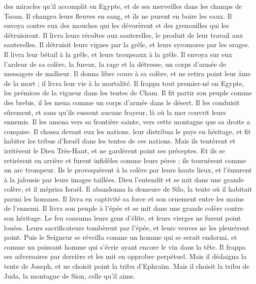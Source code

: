 \begin{multicols}{2}
des miracles qu’il accomplit en Egypte, et de ses merveilles dans les champs de Tsoan.
Il changea leurs fleuves en sang, et ils ne purent en boire les eaux.
Il envoya contre eux des mouches qui les dévorèrent et des grenouilles qui les détruisirent.
Il livra leurs récoltes aux sauterelles, le produit de leur travail aux sauterelles.
Il détruisit leurs vignes par la grêle, et leurs sycomores par les orages.
Il livra leur bétail à la grêle, et leurs troupeaux à la grêle.
Il envoya sur eux l'ardeur de sa colère, la fureur, la rage et la détresse, un corps d’armée de messagers de malheur.
Il donna libre cours à sa colère, et ne retira point leur âme de la mort ; il livra leur vie à la mortalité.
Il frappa tout premier-né en Egypte, les prémices de la vigueur dans les tentes de Cham.
Il fit partir son peuple comme des brebis, il les mena comme un corps d’armée dans le désert.
Il les conduisit sûrement, et sans qu’ils eussent aucune frayeur, là où la mer couvrit leurs ennemis.
Il les amena vers sa frontière sainte, vers cette montagne que sa droite a conquise.
Il chassa devant eux les nations, leur distribua le pays en héritage, et fit habiter les tribus d'Israël dans les tentes de ces nations.
Mais ils tentèrent et irritèrent le Dieu Très-Haut, et ne gardèrent point ses préceptes.
Et ils se retirèrent en arrière et furent infidèles comme leurs pères ; ils tournèrent comme un arc trompeur.
Ils le provoquèrent à la colère par leurs hauts lieux, et l’émurent à la jalousie par leurs images taillées.
Dieu l'entendit et se mit dans une grande colère, et il méprisa Israël.
Il abandonna la demeure de Silo, la tente où il habitait parmi les hommes.
Il livra en captivité sa force et son ornement entre les mains de l'ennemi.
Il livra son peuple à l'épée et se mit dans une grande colère contre son héritage.
Le feu consuma leurs gens d'élite, et leurs vierges ne furent point louées.
Leurs sacrificateurs tombèrent par l'épée, et leurs veuves ne les pleurèrent point.
Puis le Seigneur se réveilla comme un homme qui se serait endormi, et comme un puissant homme qui s'écrie ayant encore le vin dans la tête.
Il frappa ses adversaires par derrière et les mit en opprobre perpétuel.
Mais il dédaigna la tente de Joseph, et ne choisit point la tribu d'Ephraïm.
Mais il choisit la tribu de Juda, la montagne de Sion, celle qu’il aime.

\end{multicols}
